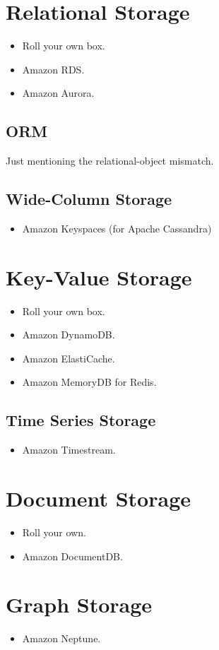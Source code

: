 \documentclass{csse4400}
\begin{document}
\section{Relational Storage}
\begin{itemize}
  \item Roll your own box.
  \item Amazon RDS.
  \item Amazon Aurora.
\end{itemize}

  \subsection{ORM}
  Just mentioning the relational-object mismatch.

  \subsection{Wide-Column Storage}
  \begin{itemize}
    \item Amazon Keyspaces (for Apache Cassandra)
  \end{itemize}

\section{Key-Value Storage}
\begin{itemize}
  \item Roll your own box.
  \item Amazon DynamoDB.
  \item Amazon ElastiCache.
  \item Amazon MemoryDB for Redis.
\end{itemize}

  \subsection{Time Series Storage}
  \begin{itemize}
    \item Amazon Timestream.
  \end{itemize}


\section{Document Storage}
\begin{itemize}
  \item Roll your own.
  \item Amazon DocumentDB.
\end{itemize}

\section{Graph Storage}
\begin{itemize}
  \item Amazon Neptune.
\end{itemize}





\end{document}
